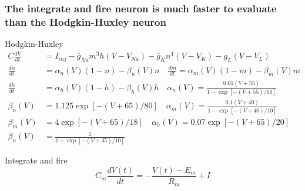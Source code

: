 \documentclass{beamer}
\begin{document}
\begin{frame}
\frametitle{The integrate and fire neuron is much faster to evaluate than the Hodgkin-Huxley neuron}

\begin{block}{Hodgkin-Huxley}
\pause
\tiny
\begin{align*}
 C\frac{dV}{dt} &= I_{inj} - \bar{g}_{Na}m^3h(V-V_{Na}) -\bar{g}_Kn^4(V-V_K) - g_L (V-V_L)\\
 \frac{dn}{dt} &= \alpha_n(V) (1-n) - \beta_n(V)n \quad
 \frac{dm}{dt} = \alpha_m(V) (1-m) - \beta_m(V)m\\
 \frac{dh}{dt} &= \alpha_h(V) (1-h) - \beta_h(V)h \quad
 \alpha_n(V) = \frac{0.01(V+55)}{1-\exp[-(V+55)/10]} \\
 \beta_n(V) &= 1.125\exp[-(V+65)/80] \quad
 \alpha_m(V)  = \frac{0.1(V+40)}{1-\exp[-(V+40)/10]} \\
 \beta_m(V) &= 4\exp[-(V+65)/18] \quad
 \alpha_h(V) = 0.07\exp[-(V+65)/20] \\
 \beta_n(V) &= \frac{1}{1+\exp[-(V+35)/10]}
\end{align*}
\end{block}
\pause
\begin{block}{Integrate and fire}
\pause
\tiny
\begin{equation*}
C_m \frac{dV(t)}{dt} = - \frac{V(t) - E_m}{R_m} + I
\end{equation*}
\end{block}
\end{frame}




\end{document}
